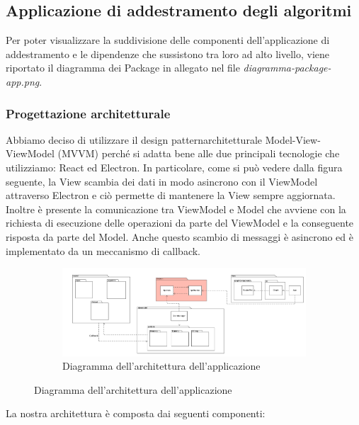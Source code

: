 \subsection{Applicazione di addestramento degli algoritmi}
Per poter visualizzare la suddivisione delle componenti dell'applicazione di addestramento e le dipendenze che sussistono tra loro ad alto livello, viene riportato il diagramma dei Package in allegato nel file \textit{diagramma-package-app.png}.
	\subsubsection{Progettazione architetturale}
	Abbiamo deciso di utilizzare il design pattern\glosp architetturale Model-View-ViewModel (MVVM) perché si adatta bene alle due principali tecnologie che utilizziamo: React ed Electron. In particolare, come si può vedere dalla figura seguente, la View scambia dei dati in modo asincrono con il ViewModel attraverso Electron e ciò permette di mantenere la View sempre aggiornata. Inoltre è presente la comunicazione tra ViewModel e Model che avviene con la richiesta di esecuzione delle operazioni da parte del ViewModel e la conseguente risposta da parte del Model. Anche questo scambio di messaggi è asincrono ed è implementato da un meccanismo di callback\glo.
	\mbox{}
	\begin{landscape}
		\begin{figure}
			\begin{figure} [H]
				\includegraphics[width=\linewidth]{./img/Diagrammi/architettura-app.png}
				\caption{Diagramma dell'architettura dell'applicazione}
			\end{figure}
		\end{figure}
	\end{landscape}
	La nostra architettura è composta dai seguenti componenti: 
